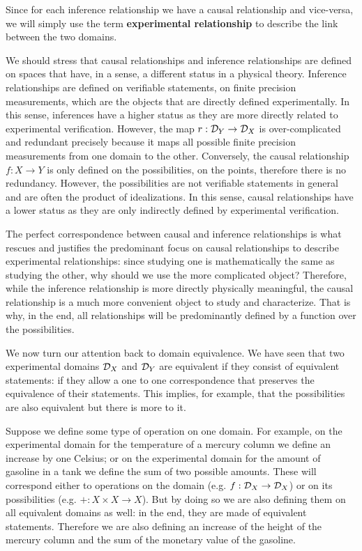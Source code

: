 \documentclass[11pt,letterpaper,fleqn]{memoir} %
\begin{document}
Since for each inference relationship we have a causal relationship and vice-versa, we will simply use the term \textbf{experimental relationship} to describe the link between the two domains.

We should stress that causal relationships and inference relationships are defined on spaces that have, in a sense, a different status in a physical theory. Inference relationships are defined on verifiable statements, on finite precision measurements, which are the objects that are directly defined experimentally. In this sense, inferences have a higher status as they are more directly related to experimental verification. However, the map $r : \mathcal{D}_Y \to \mathcal{D}_X$ is over-complicated and redundant precisely because it maps all possible finite precision measurements from one domain to the other. Conversely, the causal relationship $f : X \to Y$ is only defined on the possibilities, on the points, therefore there is no redundancy. However, the possibilities are not verifiable statements in general and are often the product of idealizations. In this sense, causal relationships have a lower status as they are only indirectly defined by experimental verification.

The perfect correspondence between causal and inference relationships is what rescues and justifies the predominant focus on causal relationships to describe experimental relationships: since studying one is mathematically the same as studying the other, why should we use the more complicated object? Therefore, while the inference relationship is more directly physically meaningful, the causal relationship is a much more convenient object to study and characterize. That is why, in the end, all relationships will be predominantly defined by a function over the possibilities.

We now turn our attention back to domain equivalence. We have seen that two experimental domains $\mathcal{D}_X$ and $\mathcal{D}_Y$ are equivalent if they consist of equivalent statements: if they allow a one to one correspondence that preserves the equivalence of their statements. This implies, for example, that the possibilities are also equivalent but there is more to it.

Suppose we define some type of operation on one domain. For example, on the experimental domain for the temperature of a mercury column we define an increase by one Celsius; or on the experimental domain for the amount of gasoline in a tank we define the sum of two possible amounts. These will correspond either to operations on the domain (e.g. $f : \mathcal{D}_X \to \mathcal{D}_X$) or on its possibilities (e.g. $+ : X \times X \to X$). But by doing so we are also defining them on all equivalent domains as well: in the end, they are made of equivalent statements. Therefore we are also defining an increase of the height of the mercury column and the sum of the monetary value of the gasoline.
\end{document}
